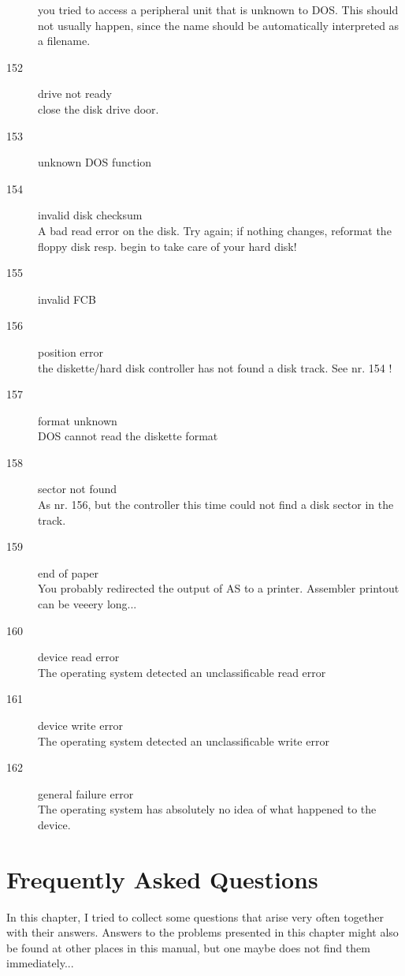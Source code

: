 \documentclass[12pt,twoside]{report}
\begin{document}
\begin{description}
{         you tried to access a peripheral unit that is unknown to DOS. This
         should not usually happen, since the name should be automatically
         interpreted as a filename.}
\item[152]{drive not ready\\
         close the disk drive door.}
\item[153]{unknown DOS function}
\item[154]{invalid disk checksum\\
         A bad read error on the disk. Try again; if nothing changes,
         reformat the floppy disk resp. begin to take care of your hard
         disk!}
\item[155]{invalid FCB}
\item[156]{position error\\
         the diskette/hard disk controller has not found a disk track. See
         nr. 154 !}
\item[157]{format unknown\\
         DOS cannot read the diskette format}
\item[158]{sector not found\\
         As nr. 156, but the controller this time could not find a disk
         sector in the track.}
\item[159]{end of paper\\
         You probably redirected the output of AS to a printer. Assembler
         printout can be veeery long...}
\item[160]{device read error\\
         The operating system detected an unclassificable read error}
\item[161]{device write error\\
         The operating system detected an unclassificable write error}
\item[162]{general failure error\\
         The operating system has absolutely no idea of what happened to the
         device.}
\end{description}


\cleardoublepage
\chapter{Frequently Asked Questions}

In this chapter, I tried to collect some questions that arise very often
together with their answers.  Answers to the problems presented in
this chapter might also be found at other places in this manual, but
one maybe does not find them immediately...
\end{document}
